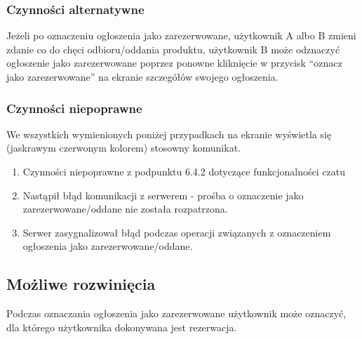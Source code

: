 \documentclass[12pt,a4paper,twoside]{article}
\begin{document}
    \subsubsection{Czynności alternatywne}
    Jeżeli po oznaczeniu ogłoszenia jako zarezerwowane, użytkownik A albo B zmieni zdanie co do chęci odbioru/oddania produktu, użytkownik B może odznaczyć ogłoszenie jako zarezerwowane poprzez ponowne kliknięcie w przycisk ``oznacz jako zarezerwowane'' na ekranie szczegółów swojego ogłoszenia.


    \subsubsection{Czynności niepoprawne}
    We wszystkich wymienionych poniżej przypadkach na ekranie wyświetla się (jaskrawym czerwonym kolorem) stosowny komunikat.
    \begin{enumerate}
        \item Czynności niepoprawne z podpunktu 6.4.2 dotyczące funkcjonalności czatu
        \item Nastąpił błąd komunikacji z serwerem - prośba o oznaczenie jako zarezerwowane/oddane nie została rozpatrzona.
        \item Serwer zasygnalizował błąd podczas operacji związanych z oznaczeniem ogłoszenia jako zarezerwowane/oddane.
    \end{enumerate}

    \subsection{Możliwe rozwinięcia}
    Podczas oznaczania ogłoszenia jako zarezerwowane użytkownik może oznaczyć, dla którego użytkownika dokonywana jest rezerwacja.
\end{document}
